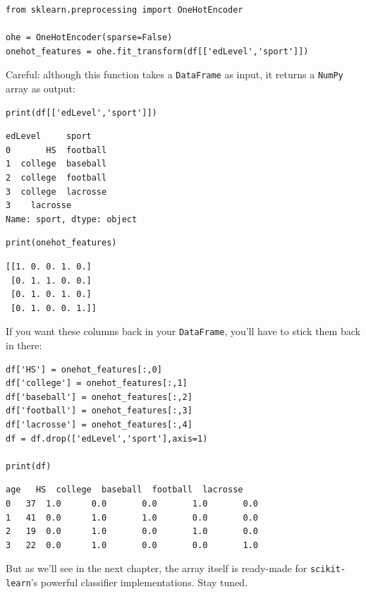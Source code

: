 
\begin{Verbatim}[fontsize=\footnotesize,samepage=true,frame=single,framesep=3mm]
from sklearn.preprocessing import OneHotEncoder

ohe = OneHotEncoder(sparse=False)
onehot_features = ohe.fit_transform(df[['edLevel','sport']])
\end{Verbatim}

Careful: although this function takes a \texttt{DataFrame} as input, it returns
a \texttt{NumPy} array as output:

\begin{Verbatim}[fontsize=\small,samepage=true,frame=single,framesep=3mm]
print(df[['edLevel','sport']])
\end{Verbatim}
\vspace{-.3in}

\begin{Verbatim}[fontsize=\small,samepage=true,frame=leftline,framesep=5mm,framerule=1mm]
   edLevel     sport
0       HS  football
1  college  baseball
2  college  football
3  college  lacrosse
3    lacrosse
Name: sport, dtype: object
\end{Verbatim}

\begin{Verbatim}[fontsize=\small,samepage=true,frame=single,framesep=3mm]
print(onehot_features)
\end{Verbatim}
\vspace{-.3in}

\begin{Verbatim}[fontsize=\small,samepage=true,frame=leftline,framesep=5mm,framerule=1mm]
[[1. 0. 0. 1. 0.]
 [0. 1. 1. 0. 0.]
 [0. 1. 0. 1. 0.]
 [0. 1. 0. 0. 1.]]
\end{Verbatim}

\medskip
If you want these columns back in your \texttt{DataFrame}, you'll have to stick
them back in there:

\begin{Verbatim}[fontsize=\small,samepage=true,frame=single,framesep=3mm]
df['HS'] = onehot_features[:,0]
df['college'] = onehot_features[:,1]
df['baseball'] = onehot_features[:,2]
df['football'] = onehot_features[:,3]
df['lacrosse'] = onehot_features[:,4]
df = df.drop(['edLevel','sport'],axis=1)

print(df)
\end{Verbatim}
\vspace{-.3in}

\begin{Verbatim}[fontsize=\small,samepage=true,frame=leftline,framesep=5mm,framerule=1mm]
   age   HS  college  baseball  football  lacrosse
0   37  1.0      0.0       0.0       1.0       0.0
1   41  0.0      1.0       1.0       0.0       0.0
2   19  0.0      1.0       0.0       1.0       0.0
3   22  0.0      1.0       0.0       0.0       1.0
\end{Verbatim}

But as we'll see in the next chapter, the array itself is ready-made for
\texttt{scikit-learn}'s powerful classifier implementations. Stay tuned.